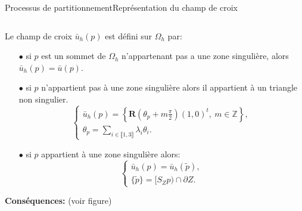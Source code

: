 \documentclass[compress,10pt,aspectratio=169]{beamer}
\begin{document}
\begin{frame}{Processus de partitionnement}{Représentation du champ de croix}
\begin{columns}
    \begin{column}{0.72\textwidth}
    \vspace{-0.1cm}
        \small
Le champ de croix $\bar{u}_h(p)$ est défini sur $\Omega_h$ par:
\begin{itemize}
\item[$\bullet$] si $p$ est un sommet de $\Omega_h$ n'appartenant pas a une zone singulière, alors $\bar{u}_h(p)=\bar{u}(p)$.\\%
\item[$\bullet$] si $p$ n'appartient pas à une zone singulière alors il appartient à un triangle non singulier.
$$
\left\{
\begin{array}{l}
\bar{u}_h(p)=\displaystyle\left\{\mathbf{R}\left(\theta_p+m\frac{\pi}{2}\right)(1,0)^t,~m\in\mathbb{Z}\right\},\\[0.2cm]
\theta_p=\sum_{i\in\llbracket1, 3\rrbracket}\lambda_i\theta_i.
\end{array}
\right.
$$
\item[$\bullet$] si $p$ appartient à une zone singulière alors:
\begin{equation*}
\label{eqn:etoilage}
\left\{
\begin{array}{l}
\bar{u}_h(p)=\bar{u}_h(\widetilde{p}),\\[0.2cm]
\{\widetilde{p}\}=[S_Zp)\cap\partial Z.
\end{array}
\right.
\end{equation*}
\end{itemize}
\vspace{-0.15cm}
\textbf{Conséquences:} (voir figure)
\vspace{0.2cm}
\end{column}


\end{columns}
\end{frame}
\end{document}
